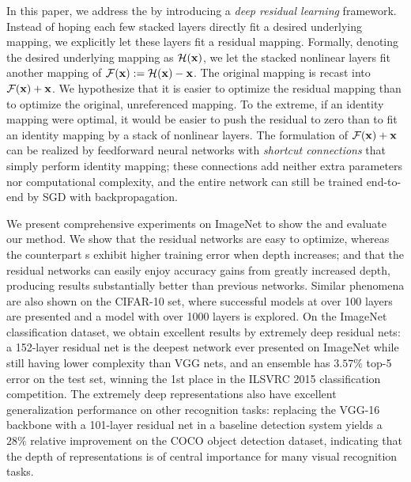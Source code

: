 In this paper, we address the \degrad{} by introducing a \emph{deep residual
learning} framework. Instead of hoping each few stacked layers directly fit a
desired underlying mapping, we explicitly let these layers fit a residual
mapping. Formally, denoting the desired underlying mapping as
$\mathcal{H}(\mathbf{x})$, we let the stacked nonlinear layers fit another mapping of
$\mathcal{F}(\mathbf{x}) := \mathcal{H}(\mathbf{x}) - \mathbf{x}$. The original mapping is recast into
$\mathcal{F}(\mathbf{x}) + \mathbf{x}$. We hypothesize that it is easier to optimize the residual
mapping than to optimize the original, unreferenced mapping. To the extreme, if
an identity mapping were optimal, it would be easier to push the residual to
zero than to fit an identity mapping by a stack of nonlinear layers. The
formulation of $\mathcal{F}(\mathbf{x}) + \mathbf{x}$ can be realized by feedforward neural
networks with \emph{shortcut connections} that simply perform identity mapping;
these connections add neither extra parameters nor computational complexity, and
the entire network can still be trained end-to-end by SGD with backpropagation.

We present comprehensive experiments on ImageNet to show the \degrad{} and
evaluate our method. We show that the residual networks are easy to optimize,
whereas the counterpart \plainnet{}s exhibit higher training error when depth
increases; and that the residual networks can easily enjoy accuracy gains from
greatly increased depth, producing results substantially better than previous
networks. Similar phenomena are also shown on the CIFAR-10 set, where successful
models at over 100 layers are presented and a model with over 1000 layers is
explored. On the ImageNet classification dataset, we obtain excellent results by
extremely deep residual nets: a 152-layer residual net is the deepest network
ever presented on ImageNet while still having lower complexity than VGG nets,
and an ensemble has $3.57\%$ top-5 error on the test set, winning the 1st place
in the ILSVRC 2015 classification competition. The extremely deep
representations also have excellent generalization performance on other
recognition tasks: replacing the VGG-16 backbone with a 101-layer residual net
in a baseline detection system yields a $28\%$ relative improvement on the COCO
object detection dataset, indicating that the depth of representations is of
central importance for many visual recognition tasks.
